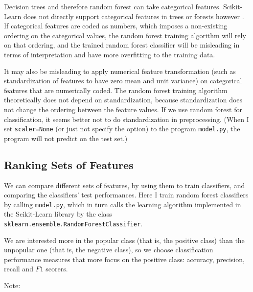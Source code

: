 \documentclass[preprint, 12pt]{elsarticle}
\begin{document}
Decision trees and therefore random forest can take categorical features. %
Scikit-Learn does not directly support categorical features in trees or forests however \cite{web:slcat}. %
If categorical features are coded as numbers, which imposes a non-existing ordering on the categorical values,
the random forest training algorithm will rely on that ordering,  and the trained random forest classifier will be misleading in terms of interpretation and have more overfitting to the training data.

It may also be misleading to apply numerical feature transformation (such as standardization of features  to have zero mean and unit variance) on  categorical features that are numerically coded.
The random forest training algorithm theoretically does not depend on standardization, because standardization does not change the ordering between the feature values.
If we use random forest for classification, it seems better not to do standardization in preprocessing. (When I set  \verb|scaler=None| (or just not specify the option) to the program \verb|model.py|, the program will not predict on the test set.)


\subsection{Ranking Sets of Features}

We can compare different sets of features, by using them to train classifiers, and comparing the classifiers' test performances.
Here I train random forest classifiers by calling \verb|model.py|, which in turn calls the learning algorithm implemented in the Scikit-Learn library by the class \verb|sklearn.ensemble.RandomForestClassifier|.

We are interested more in the popular class (that is, the positive class) than the unpopular one (that is, the negative class), so we choose classification performance measures that more focus on the positive class:  accuracy, precision, recall and $F1$ scorers.

Note:
\end{document}
